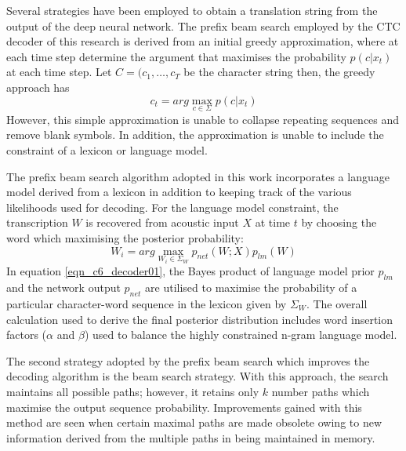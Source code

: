 Several strategies have been employed to obtain a translation string from the output of the deep neural network.  The prefix beam search employed by the CTC decoder of this research is derived from an initial greedy approximation, where at each time step determine the argument that maximises the  probability $p(c|x_t)$ at each time step. Let $C=(c_1,\dots,c_T$ be the character string then, the greedy approach has 
\begin{equation}
    c_t=arg\max_{c\in\Sigma}p(c|x_t)
\end{equation}
However, this simple approximation is unable to collapse repeating sequences and remove blank symbols. In addition, the approximation is unable to include the constraint of a lexicon or language model.

The prefix beam search algorithm \cite{hannun2014first} adopted in this work incorporates a language model derived from a lexicon in addition to keeping track of the various likelihoods used for decoding.  For the language model constraint, the transcription $W$ is recovered from acoustic input $X$ at time $t$ by choosing the word which maximising the posterior probability:
\begin{equation}
W_i=arg\max_{W_i \in \Sigma_W} p_{net}(W;X)p_{lm}(W)
\label{eqn_c6_decoder01}
\end{equation}
In equation \ref{eqn_c6_decoder01}, the Bayes product of language model prior $p_{lm}$ and the network output $p_{net}$ are utilised to maximise the probability of a particular character-word sequence in the lexicon given by $\Sigma_W$.  The overall calculation used to derive the final posterior distribution includes word insertion factors ($\alpha$ and $\beta$) used to balance the highly constrained n-gram language model.

The second strategy adopted by the prefix beam search which improves the decoding algorithm is the beam search strategy.  With this approach, the search maintains all possible paths; however, it retains only $k$ number paths which maximise the output sequence probability.  Improvements gained with this method are seen when certain maximal paths are made obsolete owing to new information derived from the multiple paths in being maintained in memory. 

